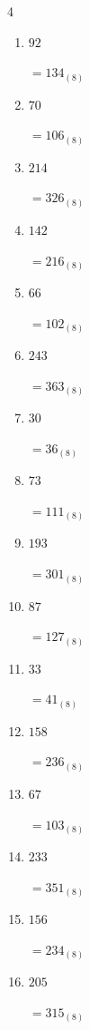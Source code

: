\begin{multicols}{4}
\begin{enumerate}
  \item $92$

        $=134_{(8)}$

  \item $70$

        $=106_{(8)}$

  \item $214$

        $=326_{(8)}$

\columnbreak %

\resetques

  \item $142$

        $=216_{(8)}$

  \item $66$

        $=102_{(8)}$

  \item $243$

        $=363_{(8)}$

  \item $30$

        $=36_{(8)}$

  \item $73$

        $=111_{(8)}$

  \item $193$

        $=301_{(8)}$

  \item $87$

        $=127_{(8)}$

  \item $33$

        $=41_{(8)}$

  \item $158$

        $=236_{(8)}$

  \item $67$

        $=103_{(8)}$

  \item $233$

        $=351_{(8)}$

  \item $156$

        $=234_{(8)}$

  \item $205$

        $=315_{(8)}$


\end{enumerate}
\end{multicols}
